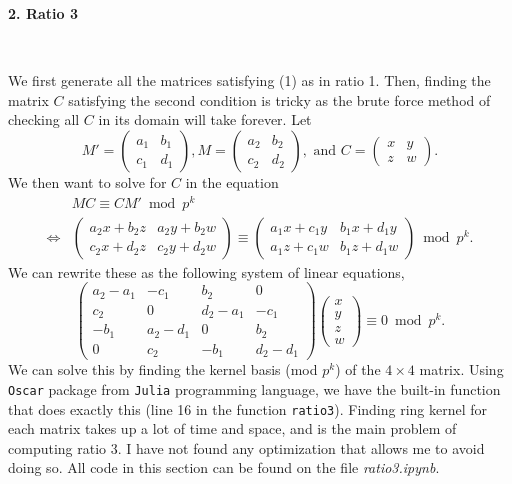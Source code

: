 \documentclass[letterpaper,12pt]{article}
\begin{document}
\newpage

{\bf \LARGE 2. Ratio 3}

\

We first generate all the matrices satisfying (1) as in ratio 1.
Then, finding the matrix $C$ satisfying the second condition is tricky
as the brute force method of checking all $C$ in its domain will take forever.
Let 
\[
M' = \begin{pmatrix}
a_1 & b_1 \\ c_1 & d_1
\end{pmatrix},
M = \begin{pmatrix}
a_2 & b_2 \\ c_2 & d_2
\end{pmatrix},
\text{ and }
C = \begin{pmatrix}
x & y \\ z & w
\end{pmatrix}.
\]
We then want to solve for $C$ in the equation 
\begin{align*}
& MC \equiv C M' \bmod p^k \\
\iff &\begin{pmatrix}
a_2x + b_2z & a_2y + b_2w \\ c_2x + d_2z & c_2y + d_2w
\end{pmatrix}
\equiv 
\begin{pmatrix}
a_1x + c_1y & b_1x+d_1y \\ a_1z + c_1w & b_1z + d_1w
\end{pmatrix} \bmod p^k .
\end{align*}
We can rewrite these as the following system of linear equations,
\begin{equation}
\begin{pmatrix}
a_2 - a_1 & -c_1 & b_2 & 0 \\
c_2 & 0 & d_2-a_1 & -c_1 \\
-b_1 & a_2-d_1 & 0 & b_2 \\
0 & c_2 & -b_1 & d_2 - d_1
\end{pmatrix}
\begin{pmatrix}
x \\ y \\ z \\ w
\end{pmatrix}
\equiv 0 \bmod p^k.
\end{equation}
We can solve this by finding the kernel basis (mod $p^k$) of the $4 \times 4$ matrix.
Using \texttt{Oscar} package from \texttt{Julia} programming language,
we have the built-in function that does exactly this (line 16 in the function \texttt{ratio3}).
Finding ring kernel for each matrix takes up a lot of time and space,
and is the main problem of computing ratio 3.
I have not found any optimization that allows me to avoid doing so.
All code in this section can be found on the file \emph{ratio3.ipynb}.
\end{document}
